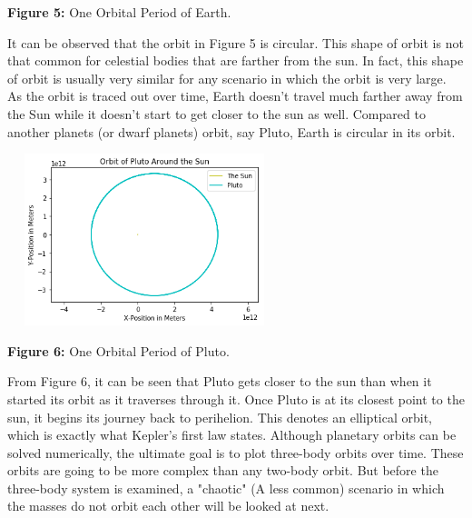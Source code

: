 \documentclass[]{article}
\begin{document}
\begin{multicols}{2}
\begin{center}
\caption{\small{\textbf{Figure 5:}} \tiny{One Orbital Period of Earth.}}
\end{center}
It can be observed that the orbit in Figure 5 is circular. This shape of orbit is not that common for celestial bodies that are farther from the sun. In fact, this shape of orbit is usually very similar for any scenario in which the orbit is very large. As the orbit is traced out over time, Earth doesn't travel much farther away from the Sun while it doesn't start to get closer to the sun as well. Compared to another planets (or dwarf planets) orbit, say Pluto, Earth is circular in its orbit.
\begin{center}
\includegraphics[width=8cm, height=5.0cm]{PHYS 342 FP Pluto Orbit.png}
\caption{\small{\textbf{Figure 6:}} \tiny{One Orbital Period of Pluto.}}
\end{center}
From Figure 6, it can be seen that Pluto gets closer to the sun than when it started its orbit as it traverses through it. Once Pluto is at its closest point to the sun, it begins its journey back to perihelion. This denotes an elliptical orbit, which is exactly what Kepler's first law states. Although planetary orbits can be solved numerically, the ultimate goal is to plot three-body orbits over time. These orbits are going to be more complex than any two-body orbit. But before the three-body system is examined, a "chaotic" (A less common) scenario in which the masses do not orbit each other will be looked at next. 
\par
\end{multicols}
\end{document}
